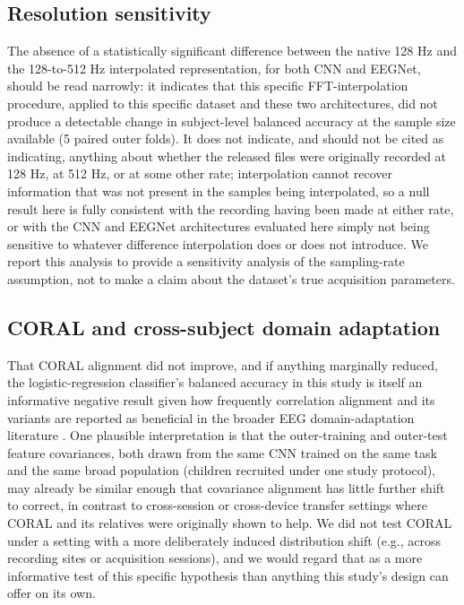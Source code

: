 \documentclass[a4paper,fleqn]{cas-sc}
\begin{document}
\subsection{Resolution sensitivity}

The absence of a statistically significant difference between the native 128 Hz and the 128-to-512 Hz interpolated representation, for both CNN and EEGNet, should be read narrowly: it indicates that this specific FFT-interpolation procedure, applied to this specific dataset and these two architectures, did not produce a detectable change in subject-level balanced accuracy at the sample size available (5 paired outer folds). It does not indicate, and should not be cited as indicating, anything about whether the released files were originally recorded at 128 Hz, at 512 Hz, or at some other rate; interpolation cannot recover information that was not present in the samples being interpolated, so a null result here is fully consistent with the recording having been made at either rate, or with the CNN and EEGNet architectures evaluated here simply not being sensitive to whatever difference interpolation does or does not introduce. We report this analysis to provide a sensitivity analysis of the sampling-rate assumption, not to make a claim about the dataset's true acquisition parameters.



\subsection{CORAL and cross-subject domain adaptation}

That CORAL alignment did not improve, and if anything marginally reduced, the logistic-regression classifier's balanced accuracy in this study is itself an informative negative result given how frequently correlation alignment and its variants are reported as beneficial in the broader EEG domain-adaptation literature \cite{li2026crosssubject,zhong2023deep}. One plausible interpretation is that the outer-training and outer-test feature covariances, both drawn from the same CNN trained on the same task and the same broad population (children recruited under one study protocol), may already be similar enough that covariance alignment has little further shift to correct, in contrast to cross-session or cross-device transfer settings where CORAL and its relatives were originally shown to help. We did not test CORAL under a setting with a more deliberately induced distribution shift (e.g., across recording sites or acquisition sessions), and we would regard that as a more informative test of this specific hypothesis than anything this study's design can offer on its own.
\end{document}
